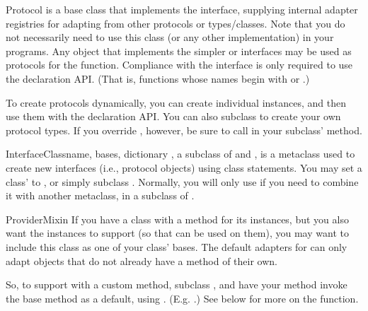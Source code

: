 \begin{verbatim%
}
\begin{verbatim%
}
\begin{verbatim%
}
\begin{verbatim%
}
\begin{classdesc*}{Protocol}
 is a base class that implements the 
interface, supplying internal adapter registries for adapting from other
protocols or types/classes.  Note that you do not necessarily need to use this
class (or any other  implementation) in
your programs.  Any object that implements the simpler  or
 interfaces may be used as protocols for the
 function.  Compliance with the 
interface is only required to use the  declaration API.
(That is, functions whose names begin with  or .)

To create protocols dynamically, you can create individual 
instances, and then use them with the declaration API.  You can also subclass
 to create your own protocol types.  If you override
, however, be sure to call 
in your subclass'  method.
\end{classdesc*}


\begin{classdesc}{InterfaceClass}{name, bases, dictionary}
, a subclass of  and , is a
metaclass used to create new interfaces (i.e., protocol objects) using class
statements.  You may set a class'  to
, or simply subclass .  Normally, you
will only use  if you need to combine it with another
metaclass, in a subclass of .
\end{classdesc}














\begin{classdesc*}{ProviderMixin}
If you have a class with a  method for its instances, but
you also want the instances to support  (so that
 can be used on them), you may want to include this
class as one of your class' bases.  The default adapters for
 can only adapt objects that do not already have a
 method of their own.

So, to support  with a custom 
method, subclass , and have your 
method invoke the base  method as a default, using
.  (E.g. .)  See below for more on
the  function.
\end{classdesc*}



\end{verbatim%
}
\end{verbatim%
}
\end{verbatim%
}
\end{verbatim%
}
